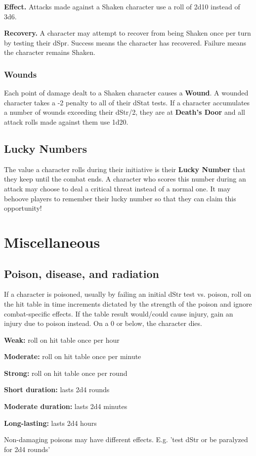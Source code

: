 \documentclass[10pt,twoside,twocolumn,openany]{book}
\begin{document}
\textbf{Effect.} Attacks made against a Shaken character use a roll of 2d10 instead of 3d6.

\textbf{Recovery.} A character may attempt to recover from being Shaken once per turn by testing their dSpr. Success means the character has recovered. Failure means the character remains Shaken.

\subsubsection{Wounds}
Each point of damage dealt to a Shaken character causes a \textbf{Wound}. A wounded character takes a -2 penalty to all of their dStat tests. If a character accumulates a number of wounds exceeding their dStr/2, they are at \textbf{Death's Door} and all attack rolls made against them use 1d20.

\subsection{Lucky Numbers}
The value a character rolls during their initiative is their \textbf{Lucky Number} that they keep until the combat ends. A character who scores this number during an attack may choose to deal a critical threat instead of a normal one. It may behoove players to remember their lucky number so that they can claim this opportunity!

\section{Miscellaneous}
\subsection{Poison, disease, and radiation}
If a character is poisoned, usually by failing an initial dStr test vs. poison, roll on the hit table in time increments dictated by the strength of the poison and ignore combat-specific effects. If the table result would/could cause injury, gain an injury due to poison instead. On a 0 or below, the character dies.
\newline
\par \textbf{Weak:} roll on hit table once per hour
\par \textbf{Moderate:} roll on hit table once per minute
\par \textbf{Strong:} roll on hit table once per round
\newline
\par \textbf{Short duration:} lasts 2d4 rounds
\par \textbf{Moderate duration:} lasts 2d4 minutes
\par \textbf{Long-lasting:} lasts 2d4 hours
\newline
\par Non-damaging poisons may have different effects. E.g. 'test dStr or be paralyzed for 2d4 rounds'
\end{document}
